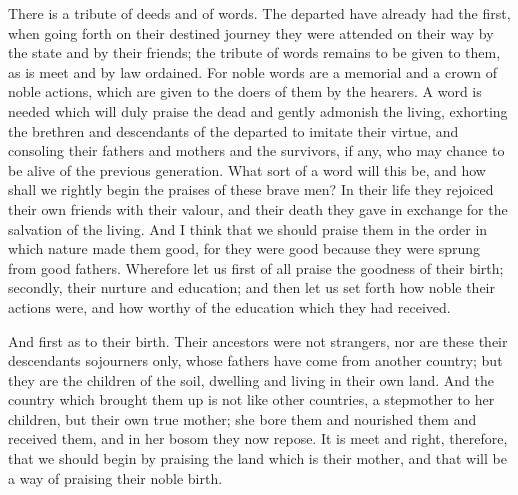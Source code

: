 \documentclass[11pt,letter]{article}
\begin{document}
\par  There is a tribute of deeds and of words. The departed have already had the first, when going forth on their destined journey they were attended on their way by the state and by their friends; the tribute of words remains to be given to them, as is meet and by law ordained. For noble words are a memorial and a crown of noble actions, which are given to the doers of them by the hearers. A word is needed which will duly praise the dead and gently admonish the living, exhorting the brethren and descendants of the departed to imitate their virtue, and consoling their fathers and mothers and the survivors, if any, who may chance to be alive of the previous generation. What sort of a word will this be, and how shall we rightly begin the praises of these brave men? In their life they rejoiced their own friends with their valour, and their death they gave in exchange for the salvation of the living. And I think that we should praise them in the order in which nature made them good, for they were good because they were sprung from good fathers. Wherefore let us first of all praise the goodness of their birth; secondly, their nurture and education; and then let us set forth how noble their actions were, and how worthy of the education which they had received.

\par  And first as to their birth. Their ancestors were not strangers, nor are these their descendants sojourners only, whose fathers have come from another country; but they are the children of the soil, dwelling and living in their own land. And the country which brought them up is not like other countries, a stepmother to her children, but their own true mother; she bore them and nourished them and received them, and in her bosom they now repose. It is meet and right, therefore, that we should begin by praising the land which is their mother, and that will be a way of praising their noble birth.
\end{document}

